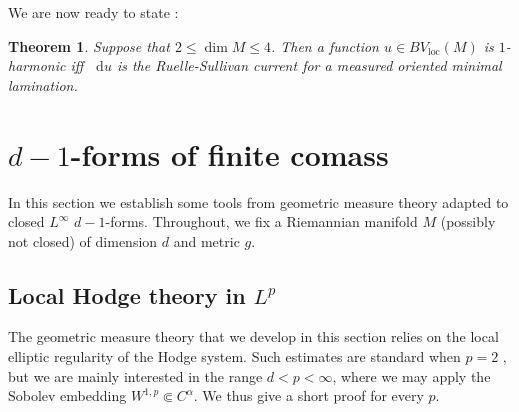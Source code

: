\documentclass[reqno,11pt]{amsart}
\newcommand*\dif{\mathop{}\!\mathrm{d}}
\newcommand{\loc}{\mathrm{loc}}
\newtheorem{theorem}{Theorem}[section]
\theoremstyle{definition}
\numberwithin{equation}{section}
\begin{document}
We are now ready to state \cite[Theorem C]{BackusCML}:

\begin{theorem}\label{1 harmonic is MOML}
Suppose that $2 \leq \dim M \leq 4$.
Then a function $u \in BV_\loc(M)$ is $1$-harmonic iff $\dif u$ is the Ruelle-Sullivan current for a measured oriented minimal lamination.
\end{theorem}




\section{\texorpdfstring{$d - 1$-forms}{(d - 1)-forms} of finite comass}\label{comass sec}
In this section we establish some tools from geometric measure theory adapted to closed $L^\infty$ $d - 1$-forms.
Throughout, we fix a Riemannian manifold $M$ (possibly not closed) of dimension $d$ and metric $g$.

\subsection{Local Hodge theory in \texorpdfstring{$L^p$}{Lp}}
The geometric measure theory that we develop in this section relies on the local elliptic regularity of the Hodge system.
Such estimates are standard when $p = 2$ \cite[\S9.5]{taylor2010partial}, but we are mainly interested in the range $d < p < \infty$, where we may apply the Sobolev embedding $W^{1, p} \Subset C^\alpha$.
We thus give a short proof for every $p$.
\end{document}
